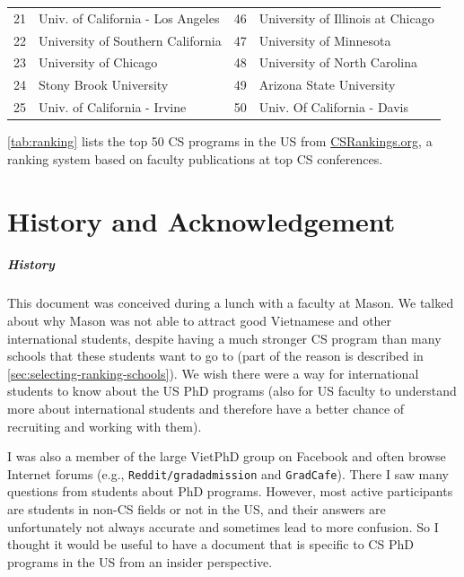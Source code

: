\documentclass[oneside,11pt,dvipsnames]{book}
\newcommand{\red}[1]{{\color{red}{#1}}}
\begin{document}
\begin{table}
\begin{tabular}{rl|rl}
    21 & Univ. of California - Los Angeles &46& University of Illinois at Chicago  \\
    22 & University of Southern California &47& University of Minnesota \\
    23 & University of Chicago &48& University of North Carolina\red{$^*$} \\
    24 & Stony Brook University\red{$^*$} &49& Arizona State University\red{$^*$} \\
    25 &  Univ. of California - Irvine&50& Univ. Of California - Davis \\
    \bottomrule
  \end{tabular}
\end{table}
\autoref{tab:ranking} lists the top 50 CS programs in the US from \href{https://www.csrankings.org}{CSRankings.org}, a ranking system  based on faculty publications at top CS conferences.


\chapter*{History and Acknowledgement}\label{sec:ack}

\paragraph{History} This document was conceived during a lunch with a faculty at Mason.  We talked about why Mason was not able to attract good Vietnamese and other international students, despite having a much stronger CS program than many schools that these students want to go to (part of the reason is described in \autoref{sec:selecting-ranking-schools}). We wish there were a way for international students to know about the US PhD programs (also for US faculty to understand more about international students and therefore have a better chance of recruiting and working with them). 

I was also a member of the large VietPhD group on Facebook and often browse Internet forums (e.g., \texttt{Reddit/gradadmission} and \texttt{GradCafe}). There I saw many questions from students about PhD programs.  However, most active participants are students in non-CS fields or not in the US, and their answers are unfortunately not always accurate and sometimes lead to more confusion. So I thought it would be useful to have a document that is specific to CS PhD programs in the US from an insider perspective.
\end{document}
